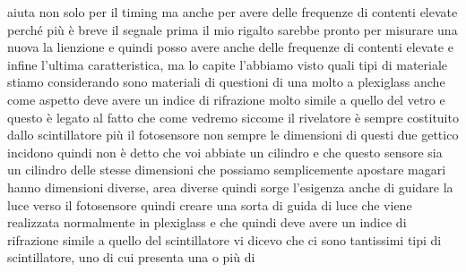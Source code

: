 aiuta non solo per il timing ma anche per avere delle frequenze di contenti elevate perché più è breve il segnale prima il mio rigalto sarebbe pronto per misurare una nuova la lienzione e quindi posso avere anche delle frequenze di contenti elevate e infine l'ultima caratteristica, ma lo capite l'abbiamo visto quali tipi di materiale stiamo considerando sono materiali di questioni di una molto a plexiglass anche come aspetto deve avere un indice di rifrazione molto simile a quello del vetro e questo è legato al fatto che come vedremo siccome il rivelatore è sempre costituito dallo scintillatore più il fotosensore non sempre le dimensioni di questi due gettico incidono quindi non è detto che voi abbiate un cilindro e che questo sensore sia un cilindro delle stesse dimensioni che possiamo semplicemente apostare magari hanno dimensioni diverse, area diverse quindi sorge l'esigenza anche di guidare la luce verso il fotosensore quindi creare una sorta di guida di luce che viene realizzata normalmente in plexiglass e che quindi deve avere un indice di rifrazione simile a quello del scintillatore vi dicevo che ci sono tantissimi tipi di scintillatore, uno di cui presenta una o più di 

